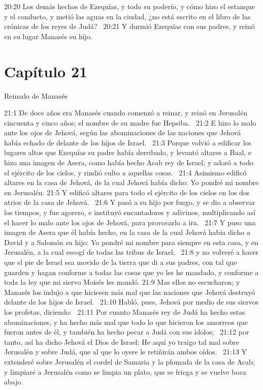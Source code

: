 20:20 Los demás hechos de Ezequías, y todo su poderío, y cómo hizo el estanque y el conducto, y metió las aguas en la ciudad, ¿no está escrito en el libro de las crónicas de los reyes de Judá?  
20:21 Y durmió Ezequías con sus padres, y reinó en su lugar Manasés su hijo.  
\section*{Capítulo 21 }
Reinado de Manasés  


21:1 De doce años era Manasés cuando comenzó a reinar, y reinó en Jerusalén cincuenta y cinco años; el nombre de su madre fue Hepsiba.  
21:2 E hizo lo malo ante los ojos de Jehová, según las abominaciones de las naciones que Jehová había echado de delante de los hijos de Israel.  
21:3 Porque volvió a edificar los lugares altos que Ezequías su padre había derribado, y levantó altares a Baal, e hizo una imagen de Asera, como había hecho Acab rey de Israel; y adoró a todo el ejército de los cielos, y rindió culto a aquellas cosas.  
21:4 Asimismo edificó altares en la casa de Jehová, de la cual Jehová había dicho: Yo pondré mi nombre en Jerusalén. 
21:5 Y edificó altares para todo el ejército de los cielos en los dos atrios de la casa de Jehová.  
21:6 Y pasó a su hijo por fuego, y se dio a observar los tiempos, y fue agorero, e instituyó encantadores y adivinos, multiplicando así el hacer lo malo ante los ojos de Jehová, para provocarlo a ira.  
21:7 Y puso una imagen de Asera que él había hecho, en la casa de la cual Jehová había dicho a David y a Salomón su hijo: Yo pondré mi nombre para siempre en esta casa, y en Jerusalén, a la cual escogí de todas las tribus de Israel;  
21:8 y no volveré a hacer que el pie de Israel sea movido de la tierra que di a sus padres, con tal que guarden y hagan conforme a todas las cosas que yo les he mandado, y conforme a toda la ley que mi siervo Moisés les mandó. 
21:9 Mas ellos no escucharon; y Manasés los indujo a que hiciesen más mal que las naciones que Jehová destruyó delante de los hijos de Israel.  
21:10 Habló, pues, Jehová por medio de sus siervos los profetas, diciendo:  
21:11 Por cuanto Manasés rey de Judá ha hecho estas abominaciones, y ha hecho más mal que todo lo que hicieron los amorreos que fueron antes de él, y también ha hecho pecar a Judá con sus ídolos;  
21:12 por tanto, así ha dicho Jehová el Dios de Israel: He aquí yo traigo tal mal sobre Jerusalén y sobre Judá, que al que lo oyere le retiñirán ambos oídos.  
21:13 Y extenderé sobre Jerusalén el cordel de Samaria y la plomada de la casa de Acab; y limpiaré a Jerusalén como se limpia un plato, que se friega y se vuelve boca abajo.  
